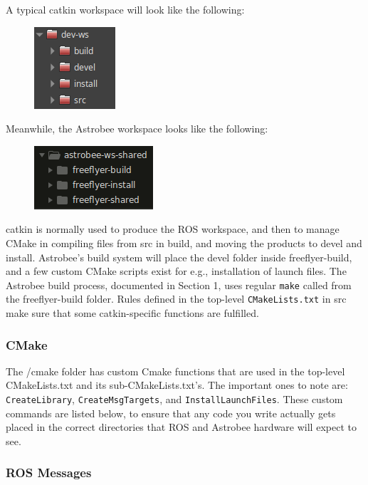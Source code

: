 \documentclass{article}
\begin{document}
A typical catkin workspace will look like the following:

\begin{figure}[h!]
	\centering
	\includegraphics[]{img/typical-ws.png}
\end{figure}

Meanwhile, the Astrobee workspace looks like the following:

\begin{figure}[h!]
	\centering
	\includegraphics[]{img/folders.png}
\end{figure}
\vspace{1cm}

catkin is normally used to produce the ROS workspace, and then to manage CMake in compiling files from src in build, and moving the products to devel and install. Astrobee's build system will place the devel folder inside freeflyer-build, and a few custom CMake scripts exist for e.g., installation of launch files. The Astrobee build process, documented in Section 1, uses regular \texttt{make} called from the freeflyer-build folder. Rules defined in the top-level \texttt{CMakeLists.txt} in src make sure that some catkin-specific functions are fulfilled.


\subsubsection{CMake}
The /cmake folder has custom Cmake functions that are used in the top-level CMakeLists.txt and its sub-CMakeLists.txt's. The important ones to note are: \texttt{CreateLibrary}, \texttt{CreateMsgTargets}, and \texttt{InstallLaunchFiles}. These custom commands are listed below, to ensure that any code you write actually gets placed in the correct directories that ROS and Astrobee hardware will expect to see.

\subsubsection{ROS Messages}
\end{document}
